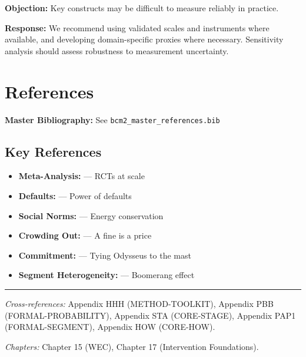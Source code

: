 \textbf{Objection:} Key constructs may be difficult to measure reliably in
practice.

\textbf{Response:} We recommend using validated scales and instruments where
available, and developing domain-specific proxies where necessary. Sensitivity
analysis should assess robustness to measurement uncertainty.


\section{References}
\label{sec:eih-references}

\begin{tcolorbox}[colback=blue!5!white, colframe=blue!75!black]
\textbf{Master Bibliography:} See \texttt{bcm2\_master\_references.bib}
\end{tcolorbox}

\subsection{Key References}

\begin{itemize}[nosep]
\item \textbf{Meta-Analysis:} \citet{dellavigna2022} --- RCTs at scale
\item \textbf{Defaults:} \citet{madrian2001} --- Power of defaults
\item \textbf{Social Norms:} \citet{allcott2011} --- Energy conservation
\item \textbf{Crowding Out:} \citet{gneezy2000} --- A fine is a price
\item \textbf{Commitment:} \citet{ashraf2006} --- Tying Odysseus to the mast
\item \textbf{Segment Heterogeneity:} \citet{schultz2007} --- Boomerang effect
\end{itemize}

\nocite{bcm_master}



\vspace{1em}
\hrule
\vspace{0.5em}

\noindent\textit{Cross-references:}
Appendix HHH (METHOD-TOOLKIT),
Appendix PBB (FORMAL-PROBABILITY),
Appendix STA (CORE-STAGE),
Appendix PAP1 (FORMAL-SEGMENT),
Appendix HOW (CORE-HOW).

\noindent\textit{Chapters:} Chapter 15 (WEC), Chapter 17 (Intervention Foundations).


